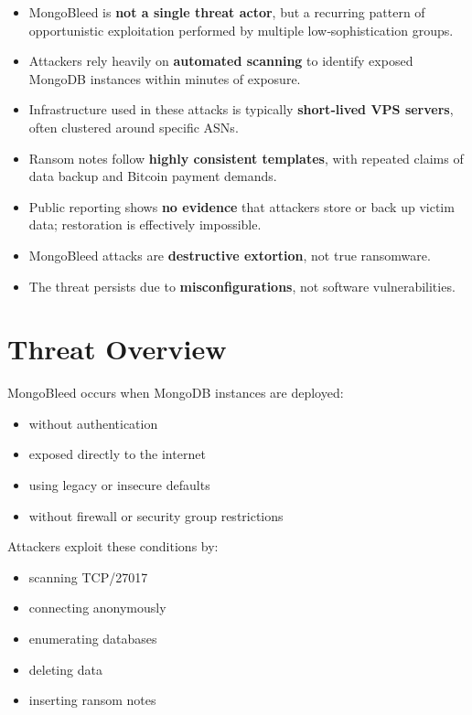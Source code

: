 \documentclass[12pt]{article}
\begin{document}
	\begin{itemize}
		\item MongoBleed is \textbf{not a single threat actor}, but a recurring pattern of opportunistic exploitation performed by multiple low‑sophistication groups.
		\item Attackers rely heavily on \textbf{automated scanning} to identify exposed MongoDB instances within minutes of exposure.
		\item Infrastructure used in these attacks is typically \textbf{short‑lived VPS servers}, often clustered around specific ASNs.
		\item Ransom notes follow \textbf{highly consistent templates}, with repeated claims of data backup and Bitcoin payment demands.
		\item Public reporting shows \textbf{no evidence} that attackers store or back up victim data; restoration is effectively impossible.
		\item MongoBleed attacks are \textbf{destructive extortion}, not true ransomware.
		\item The threat persists due to \textbf{misconfigurations}, not software vulnerabilities.
	\end{itemize}
	
	\section{Threat Overview}
	
	MongoBleed occurs when MongoDB instances are deployed:
	
	\begin{itemize}
		\item without authentication  
		\item exposed directly to the internet  
		\item using legacy or insecure defaults  
		\item without firewall or security group restrictions  
	\end{itemize}
	
	Attackers exploit these conditions by:
	
	\begin{itemize}
		\item scanning TCP/27017  
		\item connecting anonymously  
		\item enumerating databases  
		\item deleting data  
		\item inserting ransom notes  
	\end{itemize}
	
\end{document}
